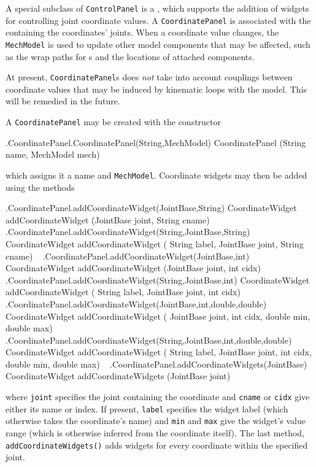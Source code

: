 A special subclass of {\tt ControlPanel} is a 
, which supports the addition
of widgets for controlling joint coordinate values. A {\tt CoordinatePanel}
is associated with the 
 containing the coordinates' joints.
When a coordinate value changes, the {\tt
MechModel} is used to update other model components that may be affected, such
as the wrap paths for
s and the locations of attached
components.

\begin{sideblock}
At present, {\tt CoordinatePanel}s does {\it not} take into account couplings
between coordinate values that may be induced by kinematic loops with the
model. This will be remedied in the future.
\end{sideblock}

A {\tt CoordinatePanel} may be created with the constructor
%
\begin{methodtable}{0.5}{0.5}
%
\methodentry
{\gui.CoordinatePanel.CoordinatePanel(String,MechModel)}%
{CoordinatePanel (String name, MechModel mech)}%
{\ }%
%
\end{methodtable}
%
which assigns it a name and {\tt MechModel}. Coordinate widgets may
then be added using the methods
%
\begin{methodtable}{0.95}{0.05}
\midline
%
\methodentry
{\gui.CoordinatePanel.addCoordinateWidget(JointBase,String)}%
{CoordinateWidget addCoordinateWidget (JointBase joint, String cname)}%
{\ }%
%
\methodentry
{\gui.CoordinatePanel.addCoordinateWidget(String,JointBase,String)}%
{CoordinateWidget addCoordinateWidget (%
String label, JointBase joint, String cname)}%
{\ }%
%
\methodentry
{\gui.CoordinatePanel.addCoordinateWidget(JointBase,int)}%
{CoordinateWidget addCoordinateWidget (JointBase joint, int cidx)}%
{\ }%
%
\methodentry
{\gui.CoordinatePanel.addCoordinateWidget(String,JointBase,int)}%
{CoordinateWidget addCoordinateWidget (%
String label, JointBase joint, int cidx)}%
{\ }%
%
\methodentry
{\gui.CoordinatePanel.addCoordinateWidget(JointBase,int,double,double)}%
{CoordinateWidget addCoordinateWidget (%
JointBase joint, int cidx, double min, double max)}%
{\ }%
%
\methodentry
{\gui.CoordinatePanel.addCoordinateWidget(String,JointBase,int,double,double)}%
{CoordinateWidget addCoordinateWidget (%
String label, JointBase joint, int cidx, double min, double max)}%
{\ }%
%
\methodspace{0.5em}%
%
\methodentry
{\gui.CoordinatePanel.addCoordinateWidgets(JointBase)}%
{CoordinateWidget addCoordinateWidgets (JointBase joint)}%
{\ }%
%
\midline
\end{methodtable}
%
where {\tt joint} specifies the joint containing the coordinate and {\tt cname}
or {\tt cidx} give either its name or index.  If present, {\tt label} specifies
the widget label (which otherwise takes the coordinate's name) and {\tt min}
and {\tt max} give the widget's value range (which is otherwise inferred from
the coordinate itself). The last method, {\tt addCoordinateWidgets()} adds
widgets for every coordinate within the specified joint.


